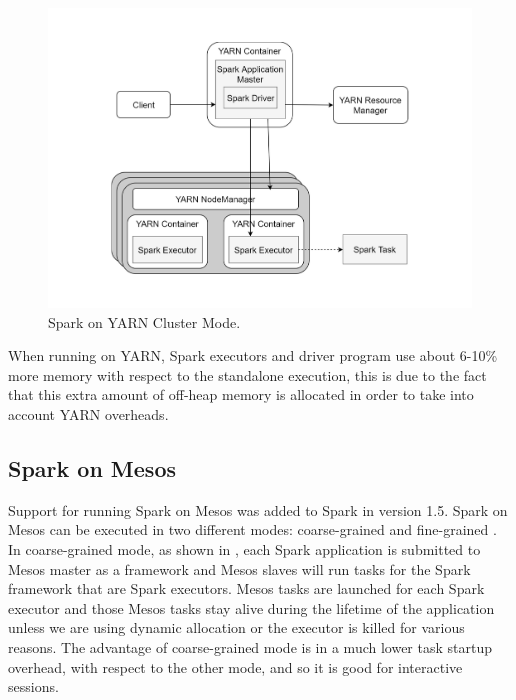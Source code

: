 \begin{figure}
	\vspace{-1cm}
	\centering
	\includegraphics[width=\columnwidth]{Images/spark_yarn_cluster_mode.pdf}  
	\vspace{-1cm}
	\caption[Spark on YARN Cluster Mode]{Spark on YARN Cluster Mode.}
	\label{fig:sparkOnYarnClusterMode}
\end{figure}

When running on YARN, Spark executors and driver program use
about 6-10\% more memory with respect to the standalone execution,
this is due to the fact that this extra amount of off-heap memory is
allocated in order to take into account YARN overheads.

\subsection{Spark on Mesos}\label{subsec:sparkOnMesos}
Support for running Spark on Mesos was added to Spark in version 1.5. Spark on Mesos can be executed in two different modes: coarse-grained and fine-grained \cite{misc:SparkOnMesos}.
In coarse-grained mode, as shown in , each Spark application is submitted to Mesos master as a framework and Mesos slaves will run tasks for the Spark framework that are Spark executors. Mesos tasks are launched for each Spark executor and those Mesos tasks stay alive during the lifetime of the application unless we are using dynamic allocation or the executor is killed for various reasons. The advantage of coarse-grained mode is in a much lower task startup overhead, with respect to the other mode, and so it is good
for interactive sessions.

